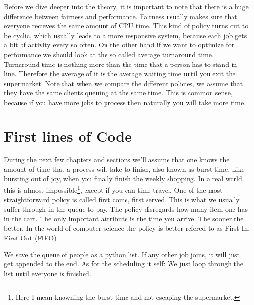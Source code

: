 Before we dive deeper into the theory, it is important to note that there is a huge difference between fairness and performance.
Fairness usually makes sure that everyone recieves the same amount of CPU time.
This kind of policy turns out to be cyclic, which usually leads to a more responsive system, because each job gets a bit of activity every so often.
On the other hand if we want to optimize for performance we should look at the so called average turnaround time.
Turnaround time is nothing more than the time that a person has to stand in line.
Therefore the average of it is the average waiting time until you exit the supermarket.
Note that when we compare the different policies, we assume that they have the same clients queuing at the same time. 
This is common sense, because if you have more jobs to process then naturally you will take more time.

\section{First lines of Code} \label{sec:first-lines-of-code}

During the next few chapters and sections we'll assume that one knows the amount of time that a process will take to finish, also known as burst time.
Like bursting out of joy, when you finally finish the weekly shopping.
In a real world this is almost impossible\footnote{Here I mean knowning the burst time and not escaping the supermarket.}, except if you can time travel.
One of the most straightforward policy is called first come, first served.
This is what we usually suffer through in the queue to pay.
The policy disregards how many item one has in the cart.
The only important attribute is the time you arrive.
The sooner the better.
In the world of computer science the policy is better refered to as First In, First Out (FIFO).

We save the queue of people as a python list.
If any other job joins, it will just get appended to the end.
As for the scheduling it self:
We just loop through the list until everyone is finished.

